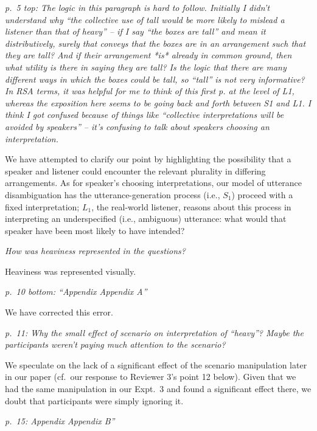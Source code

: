 \documentclass[12pt]{article}
\begin{document}
\item \emph{p.~5 top: The logic in this paragraph is hard to follow. Initially I didn't understand why ``the collective use of tall would be more likely to mislead a listener than that of heavy'' -- if I say ``the boxes are tall'' and mean it distributively, surely that conveys that the boxes are in an arrangement such that they are tall? And if their arrangement *is* already in common ground, then what utility is there in saying they are tall?
Is the logic that there are many different ways in which the boxes could be tall, so ``tall'' is not very informative? 
In RSA terms, it was helpful for me to think of this first p. at the level of L1, whereas the exposition here seems to be going back and forth between S1 and L1. I think I got confused because of things like ``collective interpretations will be avoided by speakers'' -- it's confusing to talk about speakers choosing an interpretation.}

We have attempted to clarify our point by highlighting the possibility that a speaker and listener could encounter the relevant plurality in differing arrangements. As for speaker's choosing interpretations, our model of utterance disambiguation has the utterance-generation process (i.e., $S_1$) proceed with a fixed interpretation; $L_1$, the real-world listener, reasons about this process in interpreting an underspecified (i.e., ambiguous) utterance: what would that speaker have been most likely to have intended?

\item \emph{How was heaviness represented in the questions?}

Heaviness was represented visually.

\item \emph{p.~10 bottom: ``Appendix Appendix A''}

We have corrected this error.

\item \emph{p.~11: Why the small effect of scenario on interpretation of ``heavy''? Maybe the participants weren't paying much attention to the scenario?}

We speculate on the lack of a significant effect of the scenario manipulation later in our paper (cf.~our response to Reviewer 3's point 12 below). Given that we had the same manipulation in our Expt.~3 and found a significant effect there, we doubt that participants were simply ignoring it.

\item \emph{p.~15: Appendix Appendix B''}
\end{document}
